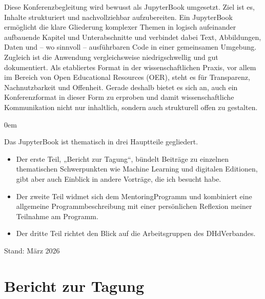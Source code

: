 \documentclass[letterpaper,10pt,english]{jupyterBook}
\begin{document}
\sphinxAtStartPar
Diese Konferenzbegleitung wird bewusst als JupyterBook umgesetzt. Ziel ist es, Inhalte strukturiert und nachvollziehbar aufzubereiten. Ein JupyterBook ermöglicht die klare Gliederung komplexer Themen in logisch aufeinander aufbauende Kapitel und Unterabschnitte und verbindet dabei Text, Abbildungen, Daten und – wo sinnvoll – ausführbaren Code in einer gemeinsamen Umgebung. Zugleich ist die Anwendung vergleichsweise niedrigschwellig und gut dokumentiert. Als etabliertes Format in der wissenschaftlichen Praxis, vor allem im Bereich von Open Educational Resources (OER), steht es für Transparenz, Nachnutzbarkeit und Offenheit. Gerade deshalb bietet es sich an, auch ein Konferenzformat in dieser Form zu erproben und damit wissenschaftliche Kommunikation nicht nur inhaltlich, sondern auch strukturell offen zu gestalten.

\begin{DUlineblock}{0em}
\item[] 
\end{DUlineblock}

\sphinxAtStartPar
Das JupyterBook ist thematisch in drei Hauptteile gegliedert.
\begin{itemize}
\item {} 
\sphinxAtStartPar
Der erste Teil, „Bericht zur Tagung“, bündelt Beiträge zu einzelnen thematischen Schwerpunkten wie Machine Learning und digitalen Editionen, gibt aber auch Einblick in andere Vorträge, die ich besucht habe.

\item {} 
\sphinxAtStartPar
Der zweite Teil widmet sich dem Mentoring\sphinxhyphen{}Programm und kombiniert eine allgemeine Programmbeschreibung mit einer persönlichen Reflexion meiner Teilnahme am Programm.

\item {} 
\sphinxAtStartPar
Der dritte Teil richtet den Blick auf die Arbeitsgruppen des DHd\sphinxhyphen{}Verbandes.

\end{itemize}

\sphinxAtStartPar
Stand: März 2026

\sphinxstepscope


\part{Bericht zur Tagung}

\sphinxstepscope
\end{document}
